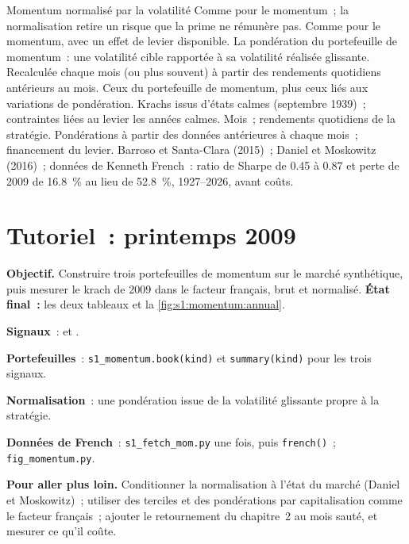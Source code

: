 \begin{strategyfile}{Momentum normalisé par la volatilité}\label{strat:s1:momentum:scaled}
 Comme pour le momentum~; la normalisation retire un risque que la prime ne rémunère pas.
 Comme pour le momentum, avec un effet de levier disponible.
 La pondération du portefeuille de momentum~: une volatilité cible rapportée à sa volatilité réalisée glissante.
 Recalculée chaque mois (ou plus souvent) à partir des rendements quotidiens antérieurs au mois.
 Ceux du portefeuille de momentum, plus ceux liés aux variations de pondération.
 Krachs issus d'états calmes (septembre 1939)~; contraintes liées au levier les années calmes.
 Mois~; rendements quotidiens de la stratégie.
 Pondérations à partir des données antérieures à chaque mois~; financement du levier.
 Barroso et Santa-Clara (2015)~; Daniel et Moskowitz (2016)~; données de Kenneth French~: ratio de Sharpe de 0.45 à 0.87 et perte de 2009 de 16.8~\% au lieu de
52.8~\%, 1927--2026, avant coûts.
\end{strategyfile}

\section{Tutoriel~: printemps 2009}\label{tut:s1:momentum:tut}

\begin{tutorial}
\textbf{Objectif.} Construire trois portefeuilles de momentum sur le marché synthétique, puis mesurer le krach de 2009 dans le facteur français, brut et normalisé. \textbf{État final~:} les
deux tableaux et la \cref{fig:s1:momentum:annual}.
\begin{tutsteps}
\item \textbf{Signaux}~:  et .
\label{lst:s1:momentum:signals}
\item \textbf{Portefeuilles}~: \texttt{s1\_momentum.book(kind)} et \texttt{summary(kind)} pour les trois signaux.
\item \textbf{Normalisation}~: une pondération issue de la volatilité glissante propre à la stratégie.
\label{lst:s1:momentum:scale}
\item \textbf{Données de French}~: \texttt{s1\_fetch\_mom.py} une fois, puis \texttt{french()}~; \texttt{fig\_momentum.py}.
\end{tutsteps}
\textbf{Pour aller plus loin.} Conditionner la normalisation à l'état du marché (Daniel et Moskowitz)~; utiliser des terciles et des pondérations par capitalisation comme le facteur français~; ajouter
le retournement du chapitre~2 au mois sauté, et mesurer ce qu'il coûte.
\end{tutorial}

